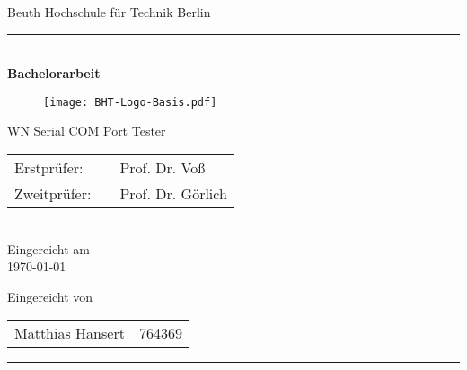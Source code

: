 

\begin{titlepage}
	\begin{center}
		\Large
		Beuth Hochschule für Technik Berlin
		\textcolor{darkBHT}{\rule{\textwidth}{0.2cm}} \\
		\vspace{2 cm}
		\Huge
		\textbf{Bachelorarbeit}
		\vspace{2 cm}
		
		\begin{figure}[htbp]
			\centering 
			\texttt{[image: BHT-Logo-Basis.pdf]}  
		\end{figure}
		
		\vspace{3cm}
		\Large
		WN Serial COM Port Tester\\
		\vspace{3cm}
		\begin{tabular}{lcl}
			Erstprüfer:& &Prof. Dr. Voß\\
			Zweitprüfer:& &Prof. Dr. Görlich\\
		\end{tabular} 
		\\
		\vspace{0.8cm}
		Eingereicht am \\
		\today %
		\vspace{0.8cm}
		
		Eingereicht von \\
		\begin{tabular}{ll}
			Matthias Hansert & 764369\\
		\end{tabular}

	\end{center}
	\vfill
	\textcolor{darkBHT}{\rule{\textwidth}{0.2cm}}
	\vspace{1 cm}
	\normalsize
	
\end{titlepage}

%
%